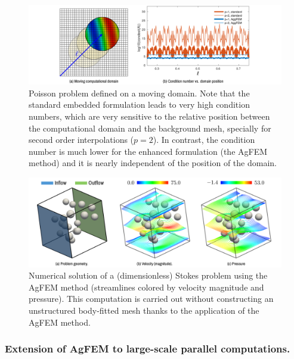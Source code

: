 \documentclass{article}
\begin{document}
\begin{figure}[ht!]
\includegraphics[width=\textwidth]{../_assets/fig3.png}
\caption{Poisson problem defined on a moving domain. Note that the standard embedded formulation leads to very high condition numbers, which are very sensitive to the relative position between the computational domain and the background mesh, specially for second order interpolations ($p=2$). In contrast, the condition number is much lower for the enhanced formulation (the AgFEM method) and it is nearly independent of the position of the domain.}
\label{fig:aggfem}
\end{figure}


\begin{figure}[ht!]
\includegraphics[width=\textwidth]{../_assets/fig4.png}
  \caption{Numerical solution of a (dimensionless) Stokes problem using the AgFEM method (streamlines colored by velocity magnitude and pressure). This computation is carried out without constructing an unstructured body-fitted mesh thanks to the application of the AgFEM method.}
  \label{fig:complex-case1-sol}
\end{figure}



\subsubsection{Extension of AgFEM to large-scale parallel computations.}
\end{document}
